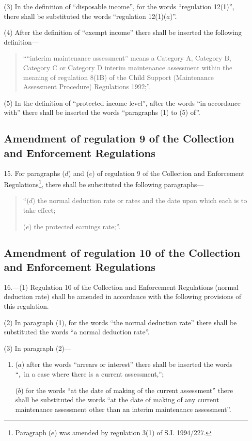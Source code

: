 \documentclass[a4paper]{article}
\begin{document}
(3) In the definition of “disposable income”, for the words “regulation 12(1)”, there shall be substituted the words “regulation 12(1)($a$)”.

(4) After the definition of “exempt income” there shall be inserted the following definition—
\begin{quotation}
““interim maintenance assessment” means a Category A, Category B, Category C or Category D interim maintenance assessment within the meaning of regulation 8(1B) of the Child Support (Maintenance Assessment Procedure) Regulations 1992;”.
\end{quotation}

(5) In the definition of “protected income level”, after the words “in accordance with” there shall be inserted the words “paragraphs (1) to (5) of”.

\subsection[15. Amendment of regulation 9 of the Collection and Enforcement Regulations]{Amendment of regulation 9 of the Collection and Enforcement Regulations}

15.  For paragraphs ($d$) and ($e$) of regulation 9 of the Collection and Enforcement Regulations\footnote{\frenchspacing Paragraph ($e$) was amended by regulation 3(1) of S.I. 1994/227.}, there shall be substituted the following paragraphs—
\begin{quotation}
“($d$) the normal deduction rate or rates and the date upon which each is to take effect;

($e$) the protected earnings rate;”.
\end{quotation}

\subsection[16. Amendment of regulation 10 of the Collection and Enforcement Regulations]{Amendment of regulation 10 of the Collection and Enforcement Regulations}

16.—(1) Regulation 10 of the Collection and Enforcement Regulations (normal deduction rate) shall be amended in accordance with the following provisions of this regulation.

(2) In paragraph (1), for the words “the normal deduction rate” there shall be substituted the words “a normal deduction rate”.

(3) In paragraph (2)—
\begin{enumerate}\item[]
($a$) after the words “arrears or interest” there shall be inserted the words “,~in a case where there is a current assessment,”;

($b$) for the words “at the date of making of the current assessment” there shall be substituted the words “at the date of making of any current maintenance assessment other than an interim maintenance assessment”.
\end{enumerate}
\end{document}
